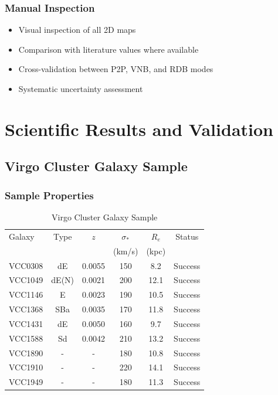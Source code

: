 \documentclass[12pt,a4paper]{article}
\begin{document}
\subsubsection{Manual Inspection}
\begin{itemize}
    \item Visual inspection of all 2D maps
    \item Comparison with literature values where available
    \item Cross-validation between P2P, VNB, and RDB modes
    \item Systematic uncertainty assessment
\end{itemize}

\section{Scientific Results and Validation}

\subsection{Virgo Cluster Galaxy Sample}

\subsubsection{Sample Properties}
\begin{table}[H]
\centering
\caption{Virgo Cluster Galaxy Sample}
\begin{tabular}{lccccc}
\toprule
Galaxy & Type & $z$ & $\sigma_*$ & $R_e$ & Status \\
       &      &     & (km/s) & (kpc) &        \\
\midrule
VCC0308 & dE   & 0.0055 & 150 & 8.2  & Success \\
VCC1049 & dE(N) & 0.0021 & 200 & 12.1 & Success \\  
VCC1146 & E    & 0.0023 & 190 & 10.5 & Success \\
VCC1368 & SBa  & 0.0035 & 170 & 11.8 & Success \\
VCC1431 & dE   & 0.0050 & 160 & 9.7  & Success \\
VCC1588 & Sd   & 0.0042 & 210 & 13.2 & Success \\
VCC1890 & -    & -      & 180 & 10.8 & Success \\
VCC1910 & -    & -      & 220 & 14.1 & Success \\
VCC1949 & -    & -      & 180 & 11.3 & Success \\
\bottomrule
\end{tabular}
\end{table}
\end{document}
